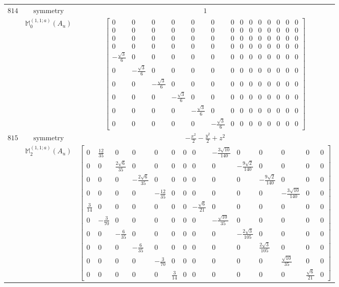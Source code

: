 \documentclass[fleqn,8pt,landscape]{jsarticle}
\begin{document}
\begin{longtable}{ccc}
$ 814 $ & $ \text{symmetry} $ & $ 1 $ \\
$  $ & $ \mathbb{M}_{0}^{(1,1;a)}(A_{u}) $ & $ \begin{bmatrix} 0 & 0 & 0 & 0 & 0 & 0 & 0 & 0 & 0 & 0 & 0 & 0 & 0 & 0 \\ 0 & 0 & 0 & 0 & 0 & 0 & 0 & 0 & 0 & 0 & 0 & 0 & 0 & 0 \\ 0 & 0 & 0 & 0 & 0 & 0 & 0 & 0 & 0 & 0 & 0 & 0 & 0 & 0 \\ 0 & 0 & 0 & 0 & 0 & 0 & 0 & 0 & 0 & 0 & 0 & 0 & 0 & 0 \\ - \frac{\sqrt{3}}{6} & 0 & 0 & 0 & 0 & 0 & 0 & 0 & 0 & 0 & 0 & 0 & 0 & 0 \\ 0 & - \frac{\sqrt{3}}{6} & 0 & 0 & 0 & 0 & 0 & 0 & 0 & 0 & 0 & 0 & 0 & 0 \\ 0 & 0 & - \frac{\sqrt{3}}{6} & 0 & 0 & 0 & 0 & 0 & 0 & 0 & 0 & 0 & 0 & 0 \\ 0 & 0 & 0 & - \frac{\sqrt{3}}{6} & 0 & 0 & 0 & 0 & 0 & 0 & 0 & 0 & 0 & 0 \\ 0 & 0 & 0 & 0 & - \frac{\sqrt{3}}{6} & 0 & 0 & 0 & 0 & 0 & 0 & 0 & 0 & 0 \\ 0 & 0 & 0 & 0 & 0 & - \frac{\sqrt{3}}{6} & 0 & 0 & 0 & 0 & 0 & 0 & 0 & 0 \end{bmatrix} $ \\ \hline
$ 815 $ & $ \text{symmetry} $ & $ - \frac{x^{2}}{2} - \frac{y^{2}}{2} + z^{2} $ \\
$  $ & $ \mathbb{M}_{2}^{(1,1;a)}(A_{u}) $ & $ \begin{bmatrix} 0 & \frac{12}{35} & 0 & 0 & 0 & 0 & 0 & 0 & - \frac{3 \sqrt{10}}{140} & 0 & 0 & 0 & 0 & 0 \\ 0 & 0 & \frac{2 \sqrt{6}}{35} & 0 & 0 & 0 & 0 & 0 & 0 & - \frac{9 \sqrt{2}}{140} & 0 & 0 & 0 & 0 \\ 0 & 0 & 0 & - \frac{2 \sqrt{6}}{35} & 0 & 0 & 0 & 0 & 0 & 0 & - \frac{9 \sqrt{2}}{140} & 0 & 0 & 0 \\ 0 & 0 & 0 & 0 & - \frac{12}{35} & 0 & 0 & 0 & 0 & 0 & 0 & - \frac{3 \sqrt{10}}{140} & 0 & 0 \\ \frac{3}{14} & 0 & 0 & 0 & 0 & 0 & 0 & - \frac{\sqrt{6}}{21} & 0 & 0 & 0 & 0 & 0 & 0 \\ 0 & - \frac{3}{70} & 0 & 0 & 0 & 0 & 0 & 0 & - \frac{\sqrt{10}}{35} & 0 & 0 & 0 & 0 & 0 \\ 0 & 0 & - \frac{6}{35} & 0 & 0 & 0 & 0 & 0 & 0 & - \frac{2 \sqrt{3}}{105} & 0 & 0 & 0 & 0 \\ 0 & 0 & 0 & - \frac{6}{35} & 0 & 0 & 0 & 0 & 0 & 0 & \frac{2 \sqrt{3}}{105} & 0 & 0 & 0 \\ 0 & 0 & 0 & 0 & - \frac{3}{70} & 0 & 0 & 0 & 0 & 0 & 0 & \frac{\sqrt{10}}{35} & 0 & 0 \\ 0 & 0 & 0 & 0 & 0 & \frac{3}{14} & 0 & 0 & 0 & 0 & 0 & 0 & \frac{\sqrt{6}}{21} & 0 \end{bmatrix} $ \\ \hline

\end{longtable}
\end{document}
